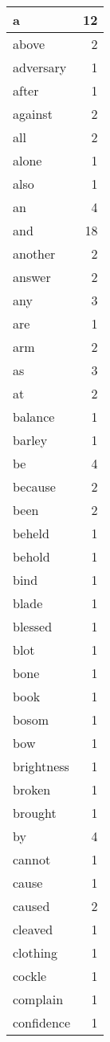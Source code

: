 \begin{center}
\begin{longtable}{l|r}
a & 12 \\ \hline
above & 2 \\ \hline
adversary & 1 \\ \hline
after & 1 \\ \hline
against & 2 \\ \hline
all & 2 \\ \hline
alone & 1 \\ \hline
also & 1 \\ \hline
an & 4 \\ \hline
and & 18 \\ \hline
another & 2 \\ \hline
answer & 2 \\ \hline
any & 3 \\ \hline
are & 1 \\ \hline
arm & 2 \\ \hline
as & 3 \\ \hline
at & 2 \\ \hline
balance & 1 \\ \hline
barley & 1 \\ \hline
be & 4 \\ \hline
because & 2 \\ \hline
been & 2 \\ \hline
beheld & 1 \\ \hline
behold & 1 \\ \hline
bind & 1 \\ \hline
blade & 1 \\ \hline
blessed & 1 \\ \hline
blot & 1 \\ \hline
bone & 1 \\ \hline
book & 1 \\ \hline
bosom & 1 \\ \hline
bow & 1 \\ \hline
brightness & 1 \\ \hline
broken & 1 \\ \hline
brought & 1 \\ \hline
by & 4 \\ \hline
cannot & 1 \\ \hline
cause & 1 \\ \hline
caused & 2 \\ \hline
cleaved & 1 \\ \hline
clothing & 1 \\ \hline
cockle & 1 \\ \hline
complain & 1 \\ \hline
confidence & 1 \\ \hline

\end{longtable}
\end{center}
